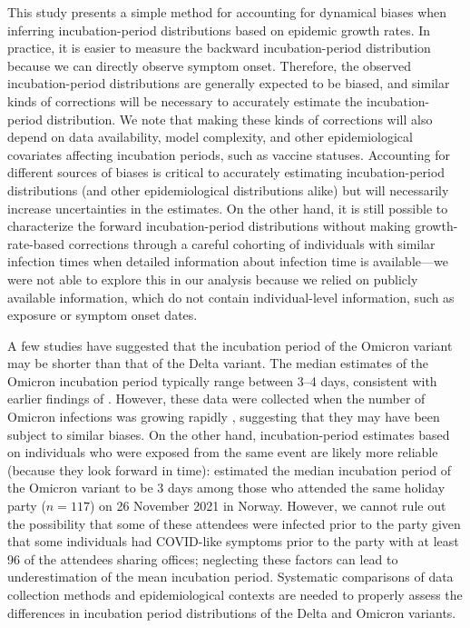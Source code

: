 \documentclass[12pt]{article}
\begin{document}
This study presents a simple method for accounting for dynamical biases when inferring incubation-period distributions based on epidemic growth rates.
In practice, it is easier to measure the backward incubation-period distribution because we can directly observe symptom onset. 
Therefore, the observed incubation-period distributions are generally expected to be biased, and similar kinds of corrections will be necessary to accurately estimate the incubation-period distribution.
We note that making these kinds of corrections will also depend on data availability, model complexity, and other epidemiological covariates affecting incubation periods, such as vaccine statuses. 
Accounting for different sources of biases is critical to accurately estimating incubation-period distributions (and other epidemiological distributions alike) but will necessarily increase uncertainties in the estimates.
On the other hand, it is still possible to characterize the forward incubation-period distributions without making growth-rate-based corrections through a careful cohorting of individuals with similar infection times when detailed information about infection time is available---we were not able to explore this in our analysis because we relied on publicly available information, which do not contain individual-level information, such as exposure or symptom onset dates.

A few studies have suggested that the incubation period of the Omicron variant may be shorter than that of the Delta variant.
The median estimates of the Omicron incubation period typically range between 3--4 days, consistent with earlier findings of \citep{backer2021omicron}. 
However, these data were collected when the number of Omicron infections was growing rapidly \citep{jansen2021investigation,song2022serial}, suggesting that they may have been subject to similar biases.
On the other hand, incubation-period estimates based on individuals who were exposed from the same event are likely more reliable (because they look forward in time):
\cite{brandal2021outbreak} estimated the median incubation period of the Omicron variant to be 3 days among those who attended the same holiday party ($n=117$) on 26 November 2021 in Norway. 
However, we cannot rule out the possibility that some of these attendees were infected prior to the party given that some individuals had COVID-like symptoms prior to the party with at least 96 of the attendees sharing offices; neglecting these factors can lead to underestimation of the mean incubation period.
Systematic comparisons of data collection methods and epidemiological contexts are needed to properly assess the differences in incubation period distributions of the Delta and Omicron variants.
\end{document}
